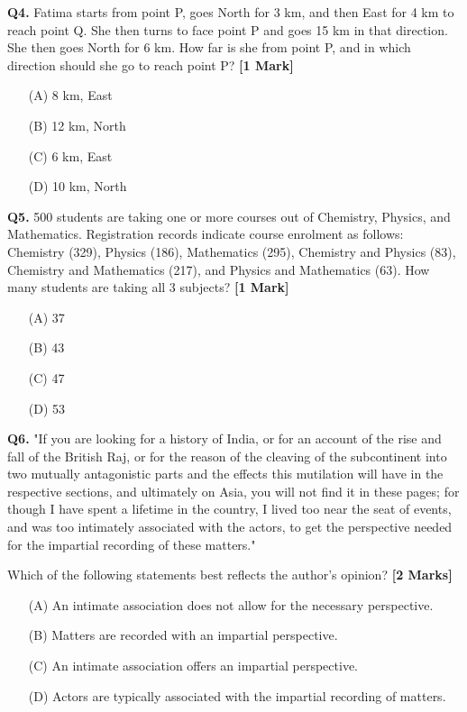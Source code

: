 \documentclass[11pt]{article}
\newcommand{\questiona}[2]{
    \noindent\textbf{Q#2.} #1 \hfill \textbf{[1 Mark]}
}
\newcommand{\questionb}[2]{
    \noindent\textbf{Q#2.} #1 \hfill \textbf{[2 Marks]}
}
\begin{document}
\vspace{0.5cm}

\questiona{Fatima starts from point P, goes North for 3 km, and then East for 4 km to reach point Q. She then turns to face point P and goes 15 km in that direction. She then goes North for 6 km. How far is she from point P, and in which direction should she go to reach point P?}{4}
\begin{enumerate}
    \item[(A)] 8 km, East  
    \item[(B)] 12 km, North  
    \item[(C)] 6 km, East  
    \item[(D)] 10 km, North  
\end{enumerate}

\vspace{0.5cm}

\questiona{500 students are taking one or more courses out of Chemistry, Physics, and Mathematics. Registration records indicate course enrolment as follows: Chemistry (329), Physics (186), Mathematics (295), Chemistry and Physics (83), Chemistry and Mathematics (217), and Physics and Mathematics (63). How many students are taking all 3 subjects?}{5}
\begin{enumerate}
    \item[(A)] 37  
    \item[(B)] 43  
    \item[(C)] 47  
    \item[(D)] 53  
\end{enumerate}

\vspace{0.5cm}

\questionb{"If you are looking for a history of India, or for an account of the rise and fall of the British Raj, or for the reason of the cleaving of the subcontinent into two mutually antagonistic parts and the effects this mutilation will have in the respective sections, and ultimately on Asia, you will not find it in these pages; for though I have spent a lifetime in the country, I lived too near the seat of events, and was too intimately associated with the actors, to get the perspective needed for the impartial recording of these matters."

Which of the following statements best reflects the author's opinion?}{6}
\begin{enumerate}
    \item[(A)] An intimate association does not allow for the necessary perspective.
    \item[(B)] Matters are recorded with an impartial perspective.
    \item[(C)] An intimate association offers an impartial perspective.
    \item[(D)] Actors are typically associated with the impartial recording of matters.
\end{enumerate}
\end{document}
